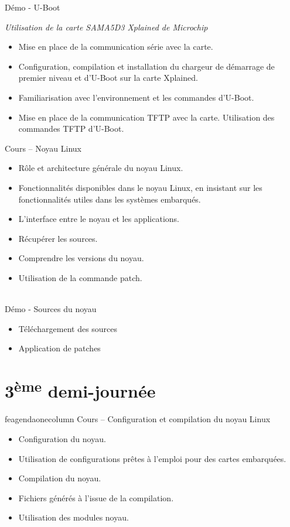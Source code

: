 \documentclass[a4paper,12pt,obeyspaces,spaces,hyphens]{article}
\begin{document}
\feagendatwocolumn
{Démo - U-Boot}
{
  {\em Utilisation de la carte SAMA5D3 Xplained de Microchip}
  \begin{itemize}
  \item Mise en place de la communication série avec la carte.
  \item Configuration, compilation et installation du chargeur de
	démarrage de premier niveau et d'U-Boot sur la carte Xplained.
  \item Familiarisation avec l'environnement et les commandes d'U-Boot.
  \item Mise en place de la communication TFTP avec la carte.
	Utilisation des commandes TFTP d'U-Boot.
  \end{itemize}
}
{Cours – Noyau Linux}
{
  \begin{itemize}
  \item Rôle et architecture générale du noyau Linux.
  \item Fonctionnalités disponibles dans le noyau Linux, en insistant
	sur les fonctionnalités utiles dans les systèmes embarqués.
  \item L'interface entre le noyau et les applications.
  \item Récupérer les sources.
  \item Comprendre les versions du noyau.
  \item Utilisation de la commande patch.
  \end{itemize}
}
\\

\feagendaonecolumn
{Démo - Sources du noyau}
{
  \begin{itemize}
  \item Téléchargement des sources
  \item Application de patches
  \end{itemize}
}

\section{3\textsuperscript{ème} demi-journée}

feagendaonecolumn
{Cours – Configuration et compilation du noyau Linux}
{
  \begin{itemize}
  \item Configuration du noyau.
  \item Utilisation de configurations prêtes à l'emploi pour des cartes embarquées.
  \item Compilation du noyau.
  \item Fichiers générés à l'issue de la compilation.
  \item Utilisation des modules noyau.
  \end{itemize}
}
\end{document}
